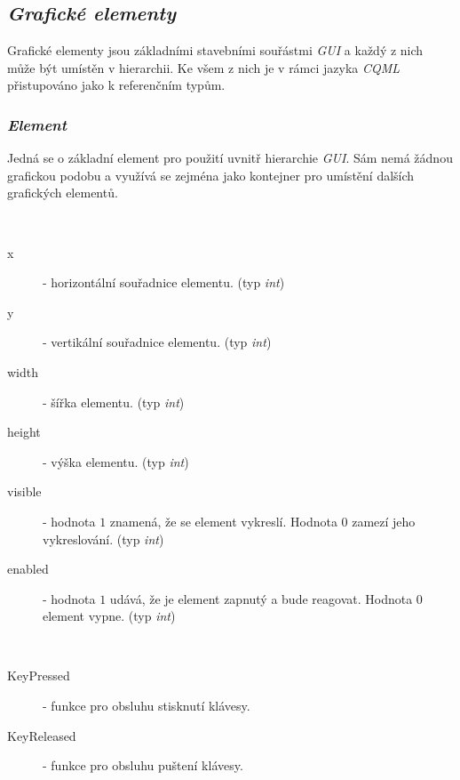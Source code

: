 \documentclass{article}
\begin{document}
\subsection{\textit{Grafické elementy}}
Grafické elementy jsou základními stavebními souřástmi \textit{GUI} a každý z nich může být umístěn v hierarchii. Ke všem z nich je v rámci jazyka \textit{CQML} přistupováno jako k referenčním typům.

\subsubsection{\textit{Element}}
Jedná se o základní element pro použití uvnitř hierarchie \textit{GUI}. Sám nemá žádnou grafickou podobu a využívá se zejména jako kontejner pro umístění dalších grafických elementů.\\
\begin{description}
\item[Seznam atributů:] ~
\begin{description}
\item[x] - horizontální souřadnice elementu. (typ \textit{int})
\item[y] - vertikální souřadnice elementu. (typ \textit{int})
\item[width] - šířka elementu. (typ \textit{int})
\item[height] - výška elementu. (typ \textit{int})
\item[visible] - hodnota $1$ znamená, že se element vykreslí. Hodnota $0$ zamezí jeho vykreslování. (typ \textit{int})
\item[enabled] - hodnota $1$ udává, že je element zapnutý a bude reagovat. Hodnota $0$ element vypne. (typ \textit{int})
\end{description}
\item
\item[Seznam funkcí pro obsluhu událostí:] ~
\begin{description}
\item[KeyPressed] - funkce pro obsluhu stisknutí klávesy.
\item[KeyReleased] - funkce pro obsluhu puštení klávesy.
\end{description}
\end{description}
\end{document}
